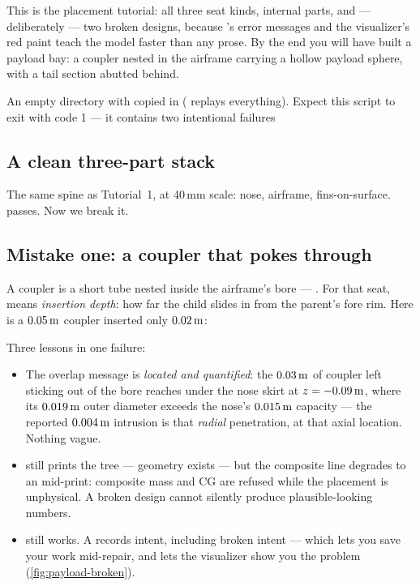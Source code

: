 This is the placement tutorial: all three seat kinds, internal parts, and ---
deliberately --- two broken designs, because 's error
messages and the visualizer's red paint teach the model faster than any prose.
By the end you will have built a payload bay: a coupler nested in the airframe
carrying a hollow payload sphere, with a tail section abutted behind.

\begin{note}[Setup]
An empty directory with  copied in
( replays everything). Expect this script to exit
with code 1 --- it contains two intentional failures
\end{note}

\subsection*{A clean three-part stack}



The same spine as Tutorial~1, at 40\,mm scale: nose, airframe,
fins-on-surface.  passes. Now we break it.

\subsection*{Mistake one: a coupler that pokes through}

A coupler is a short tube nested inside the airframe's bore ---
. For that seat,  means \emph{insertion
depth}: how far the child slides in from the parent's fore rim. Here is a
$0.05\,\mathrm{m}$ coupler inserted only $0.02\,\mathrm{m}$:



Three lessons in one failure:

\begin{itemize}
\item The overlap message is \emph{located and quantified}: the $0.03\,\mathrm{m}$ of
      coupler left sticking out of the bore reaches under the nose skirt at
      $z=-0.09\,\mathrm{m}$, where its $0.019\,\mathrm{m}$ outer diameter exceeds the nose's
      $0.015\,\mathrm{m}$ capacity --- the reported $0.004\,\mathrm{m}$ intrusion is that
      \emph{radial} penetration, at that axial location. Nothing vague.
\item {} still prints the tree --- geometry exists --- but the
      composite line degrades to an \err{} mid-print: composite mass and CG
      are refused while the placement is unphysical. A broken design cannot
      silently produce plausible-looking numbers.
\item {} still works. A  records intent, including
      broken intent --- which lets you save your work mid-repair, and lets
      the visualizer show you the problem
      (\cref{fig:payload-broken}).
\end{itemize}

